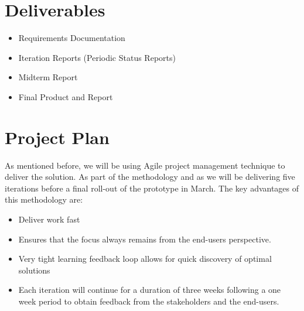 \documentclass{journal}
\begin{document}
\section{Deliverables}
\begin{itemize}
 \item{ Requirements Documentation }
 \item{ Iteration Reports (Periodic Status Reports) }
 \item{ Midterm Report}
 \item{ Final Product and Report }
\end{itemize}
\section{Project Plan}
As mentioned before, we will be using Agile project management technique to deliver the solution. As part of the methodology and as we will be delivering five iterations before a final roll-out of the prototype in March. The key advantages of this methodology are:
\begin{itemize}
\item Deliver work fast
\item Ensures that the focus always remains from the end-users perspective. 
\item Very tight learning feedback loop allows for quick discovery of optimal solutions
\item Each iteration will continue for a duration of three weeks following a one week period to obtain feedback from the stakeholders and the end-users.
\end{itemize}
\newpage
\thispagestyle{empty}
\end{document}
